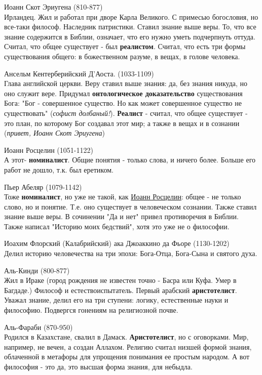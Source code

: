 \documentclass[12pt,a4paper]{article}
\begin{document}
Иоанн Скот Эриугена (810-877)\\
Ирландец. Жил и работал при дворе Карла Великого. С примесью  богословия, но все-таки философ. Наследник патристики. Ставил знание выше веры. То, что все знание содержится в Библии, означает, что его нужно уметь подчерпнуть оттуда. Считал, что общее существует - был \textbf{реалистом}. Считал, что есть три формы существования общего: в божественном разуме, в вещах, в голове человека.

Ансельм Кентерберийский Д'Аоста. (1033-1109)\\
Глава английской церкви. Веру ставил выше знания: да, без знания никуда, но оно служит вере. Придумал \textbf{онтологическое доказательство} существования Бога: "Бог - совершенное существо. Но как может совершенное существо не существовать" (\textit{софист долбаный!}). \textbf{Реалист} - считал, что общее существует  - это план, по которому Бог создавал этот мир; а также в вещах и в сознании (\textit{привет, Иоанн Скот Эриугена})

Иоанн Росцелин (1051-1122)\\
А этот- \textbf{номиналист}. Общие понятия - только слова, и ничего более. Больше его работ не дошло, т.к. был еретиком.

Пьер Абеляр (1079-1142)\\
Тоже \textbf{номиналист}, но уже не такой, как \underline{Иоанн Росцелин}: общее - не только слово, но и понятие. Т.е. оно существует в человеческом сознании. Также ставил знание выше веры. В сочинении "Да и нет" привел противоречия в Библии. Также написал "Историю моих бедствий", хотя это уже не о философии.

Иоахим Флорский (Калабрийский) ака Джоаккино да Фьоре  (1130-1202)\\
Делил историю человечества на три эпохи: Бога-Отца, Бога-Сына и святого духа.

Аль-Кинди (800-877)\\
Жил в Ираке (город рождения не известен точно - Басра или Куфа. Умер в Багдаде.) Философ и естествоиспытатель. Первый арабский \textbf{аристотелист}. Уважал знание, делил его на три ступени: логику, естественные науки и философию. Подвергся гонениям на религиозной почве.

Аль-Фараби (870-950)\\
Родился в Казахстане, свалил в Дамаск. \textbf{Аристотелист}, но с оговорками. Мир, например, не вечен, а создан Аллахом. Религию считал низшей формой знания, облаченной в метафоры для упрощения понимания ее простым народом. А вот философия - это да, это высшая форма знания, для небыдла.
\end{document}
